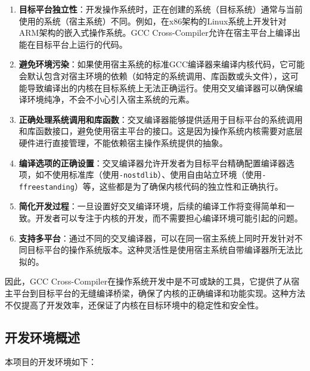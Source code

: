 \begin{enumerate}
    \item \textbf{目标平台独立性}：开发操作系统时，正在创建的系统（目标系统）通常与当前使用的系统（宿主系统）不同。例如，在x86架构的Linux系统上开发针对ARM架构的嵌入式操作系统。GCC Cross-Compiler允许在宿主平台上编译出能在目标平台上运行的代码。
    \item \textbf{避免环境污染}：如果使用宿主系统的标准GCC编译器来编译内核代码，它可能会默认包含对宿主环境的依赖（如特定的系统调用、库函数或头文件），这可能导致编译出的内核在目标系统上无法正确运行。使用交叉编译器可以确保编译环境纯净，不会不小心引入宿主系统的元素。
    \item \textbf{正确处理系统调用和库函数}：交叉编译器能够提供适用于目标平台的系统调用和库函数接口，避免使用宿主平台的接口。这是因为操作系统内核需要对底层硬件进行直接管理，不能依赖宿主操作系统提供的抽象。
    \item \textbf{编译选项的正确设置}：交叉编译器允许开发者为目标平台精确配置编译器选项，如不使用标准库（使用\texttt{-nostdlib}）、使用自由站立环境（使用\texttt{-ffreestanding}）等，这些都是为了确保内核代码的独立性和正确执行。
    \item \textbf{简化开发过程}：一旦设置好交叉编译环境，后续的编译工作将变得简单和一致。开发者可以专注于内核的开发，而不需要担心编译环境可能引起的问题。
    \item \textbf{支持多平台}：通过不同的交叉编译器，可以在同一宿主系统上同时开发针对不同目标平台的操作系统版本。这种灵活性是使用宿主系统自带编译器所无法比拟的。
\end{enumerate}

因此，GCC Cross-Compiler在操作系统开发中是不可或缺的工具，它提供了从宿主平台到目标平台的无缝编译桥梁，确保了内核的正确编译和功能实现。这种方法不仅提高了开发效率，还保证了内核在目标环境中的稳定性和安全性。

\subsection{开发环境概述}

本项目的开发环境如下：

